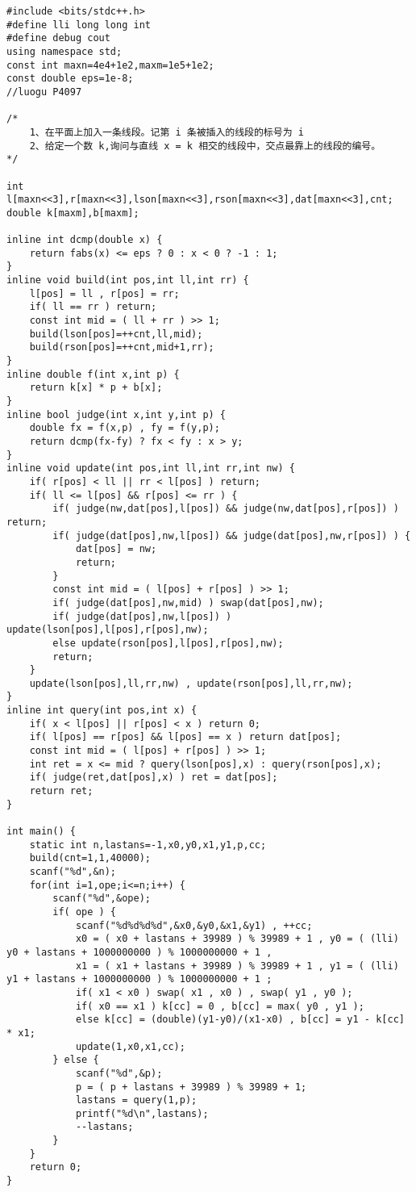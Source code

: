 \begin{lstlisting}
#include <bits/stdc++.h>
#define lli long long int
#define debug cout
using namespace std;
const int maxn=4e4+1e2,maxm=1e5+1e2;
const double eps=1e-8;
//luogu P4097

/*
	1、在平面上加入一条线段。记第 i 条被插入的线段的标号为 i
	2、给定一个数 k,询问与直线 x = k 相交的线段中，交点最靠上的线段的编号。
*/

int l[maxn<<3],r[maxn<<3],lson[maxn<<3],rson[maxn<<3],dat[maxn<<3],cnt;
double k[maxm],b[maxm];

inline int dcmp(double x) {
    return fabs(x) <= eps ? 0 : x < 0 ? -1 : 1;
}
inline void build(int pos,int ll,int rr) {
    l[pos] = ll , r[pos] = rr;
    if( ll == rr ) return;
    const int mid = ( ll + rr ) >> 1;
    build(lson[pos]=++cnt,ll,mid);
    build(rson[pos]=++cnt,mid+1,rr);
}
inline double f(int x,int p) {
    return k[x] * p + b[x];
}
inline bool judge(int x,int y,int p) {
    double fx = f(x,p) , fy = f(y,p);
    return dcmp(fx-fy) ? fx < fy : x > y;
}
inline void update(int pos,int ll,int rr,int nw) {
    if( r[pos] < ll || rr < l[pos] ) return;
    if( ll <= l[pos] && r[pos] <= rr ) {
        if( judge(nw,dat[pos],l[pos]) && judge(nw,dat[pos],r[pos]) ) return;
        if( judge(dat[pos],nw,l[pos]) && judge(dat[pos],nw,r[pos]) ) {
            dat[pos] = nw;
            return;
        }
        const int mid = ( l[pos] + r[pos] ) >> 1;
        if( judge(dat[pos],nw,mid) ) swap(dat[pos],nw);
        if( judge(dat[pos],nw,l[pos]) ) update(lson[pos],l[pos],r[pos],nw);
        else update(rson[pos],l[pos],r[pos],nw);
        return;
    }
    update(lson[pos],ll,rr,nw) , update(rson[pos],ll,rr,nw);
}
inline int query(int pos,int x) {
    if( x < l[pos] || r[pos] < x ) return 0;
    if( l[pos] == r[pos] && l[pos] == x ) return dat[pos];
    const int mid = ( l[pos] + r[pos] ) >> 1;
    int ret = x <= mid ? query(lson[pos],x) : query(rson[pos],x);
    if( judge(ret,dat[pos],x) ) ret = dat[pos];
    return ret;
}

int main() {
    static int n,lastans=-1,x0,y0,x1,y1,p,cc;
    build(cnt=1,1,40000);
    scanf("%d",&n);
    for(int i=1,ope;i<=n;i++) {
        scanf("%d",&ope);
        if( ope ) {
            scanf("%d%d%d%d",&x0,&y0,&x1,&y1) , ++cc;
            x0 = ( x0 + lastans + 39989 ) % 39989 + 1 , y0 = ( (lli) y0 + lastans + 1000000000 ) % 1000000000 + 1 ,
            x1 = ( x1 + lastans + 39989 ) % 39989 + 1 , y1 = ( (lli) y1 + lastans + 1000000000 ) % 1000000000 + 1 ;
            if( x1 < x0 ) swap( x1 , x0 ) , swap( y1 , y0 );
            if( x0 == x1 ) k[cc] = 0 , b[cc] = max( y0 , y1 );
            else k[cc] = (double)(y1-y0)/(x1-x0) , b[cc] = y1 - k[cc] * x1;
            update(1,x0,x1,cc);
        } else {
            scanf("%d",&p);
            p = ( p + lastans + 39989 ) % 39989 + 1;
            lastans = query(1,p);
            printf("%d\n",lastans);
            --lastans;
        }
    }
    return 0;
}
\end{lstlisting}